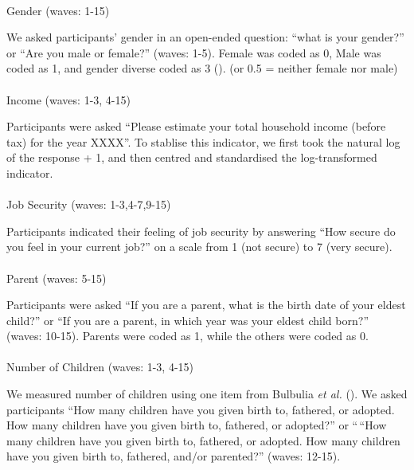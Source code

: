 \documentclass[
  singlecolumn,
  9pt]{article}
\makeatletter
\let\oldparagraph\paragraph
\renewcommand{\paragraph}{
    \@ifstar
      \xxxParagraphStar
      \xxxParagraphNoStar
  }
\newcommand{\xxxParagraphStar}[1]{\oldparagraph*{#1}\mbox{}}
\newcommand{\xxxParagraphNoStar}[1]{\oldparagraph{#1}\mbox{}}
\makeatother
\begin{document}
\paragraph{Gender (waves: 1-15)}\label{gender-waves-1-15}

We asked participants' gender in an open-ended question: ``what is your
gender?'' or ``Are you male or female?'' (waves: 1-5). Female was coded
as 0, Male was coded as 1, and gender diverse coded as 3
(). (or 0.5
= neither female nor male)

\paragraph{Income (waves: 1-3, 4-15)}\label{income-waves-1-3-4-15}

Participants were asked ``Please estimate your total household income
(before tax) for the year XXXX''. To stablise this indicator, we first
took the natural log of the response + 1, and then centred and
standardised the log-transformed indicator.

\paragraph{Job Security (waves:
1-3,4-7,9-15)}\label{job-security-waves-1-34-79-15}

Participants indicated their feeling of job security by answering ``How
secure do you feel in your current job?'' on a scale from 1 (not secure)
to 7 (very secure).

\paragraph{Parent (waves: 5-15)}\label{parent-waves-5-15}

Participants were asked ``If you are a parent, what is the birth date of
your eldest child?'' or ``If you are a parent, in which year was your
eldest child born?'' (waves: 10-15). Parents were coded as 1, while the
others were coded as 0.

\paragraph{Number of Children (waves: 1-3,
4-15)}\label{number-of-children-waves-1-3-4-15}

We measured number of children using one item from Bulbulia \emph{et
al.} (). We asked participants ``How
many children have you given birth to, fathered, or adopted. How many
children have you given birth to, fathered, or adopted?'' or ``\,``How
many children have you given birth to, fathered, or adopted. How many
children have you given birth to, fathered, and/or parented?'' (waves:
12-15).
\end{document}
